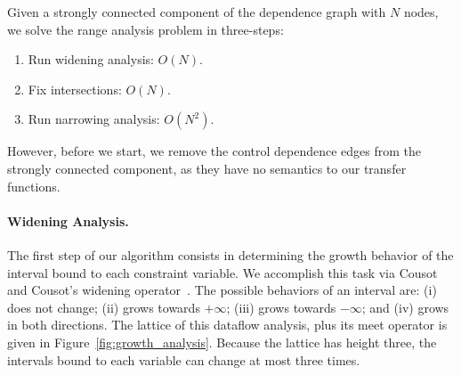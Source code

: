 \documentclass[preprint]{sigplanconf}
\begin{document}
Given a strongly connected component of the dependence graph with $N$ nodes,
we solve the range analysis problem in three-steps:
\begin{enumerate}
\item Run widening analysis: $O(N)$.

\item Fix intersections: $O(N)$.

\item Run narrowing analysis: $O(N^2)$.

\end{enumerate}
However, before we start, we remove the control dependence edges from the
strongly connected component, as they have no semantics to our transfer
functions.

\paragraph{Widening Analysis.}

The first step of our algorithm consists in determining the growth behavior of
the interval bound to each constraint variable.
We accomplish this task via Cousot and Cousot's widening
operator~\cite[p.247]{Cousot77}.
The possible behaviors of an interval are:
(i) does not change;
(ii) grows towards $+\infty$;
(iii) grows towards $-\infty$; and
(iv) grows in both directions.
The lattice of this dataflow analysis, plus its meet operator is given in
Figure~\ref{fig:growth_analysis}.
Because the lattice has height three, the intervals bound to each variable can
change at most three times.
\end{document}
